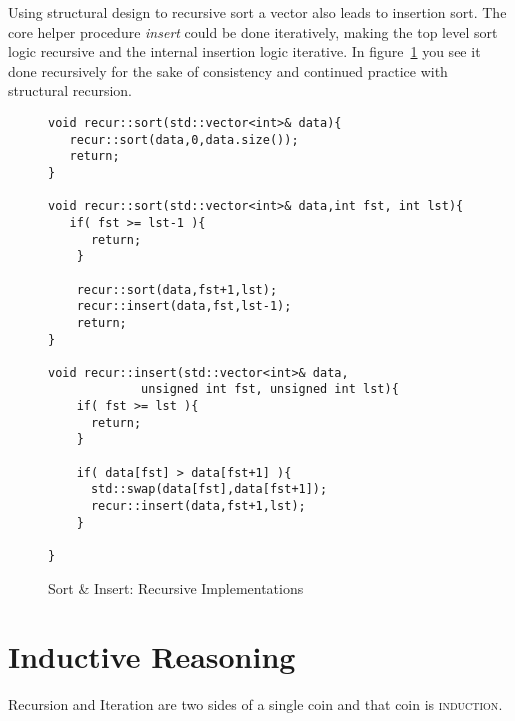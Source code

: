 \documentclass[nobib]{tufte-handout}
\begin{document}
Using structural design to recursive sort a vector also leads to insertion sort.  The core helper procedure \textit{insert} could be done iteratively, making the top level sort logic recursive and the internal insertion logic iterative.  In figure~\ref{code:isortrec} you see it done recursively for the sake of consistency and continued practice with structural recursion.

\begin{figure}
\begin{lstlisting}
void recur::sort(std::vector<int>& data){
   recur::sort(data,0,data.size());
   return;
}

void recur::sort(std::vector<int>& data,int fst, int lst){
   if( fst >= lst-1 ){
      return;
    }

    recur::sort(data,fst+1,lst);
    recur::insert(data,fst,lst-1);
    return;
}

void recur::insert(std::vector<int>& data,
		     unsigned int fst, unsigned int lst){
    if( fst >= lst ){
      return;
    }

    if( data[fst] > data[fst+1] ){
      std::swap(data[fst],data[fst+1]);
      recur::insert(data,fst+1,lst);
    }

}
\end{lstlisting}
\label{code:isortrec}
\caption{Sort \& Insert: Recursive Implementations}
\end{figure}

\section{Inductive Reasoning}

Recursion and Iteration are two sides of a single coin and that coin is \textsc{induction}. 
\end{document}
